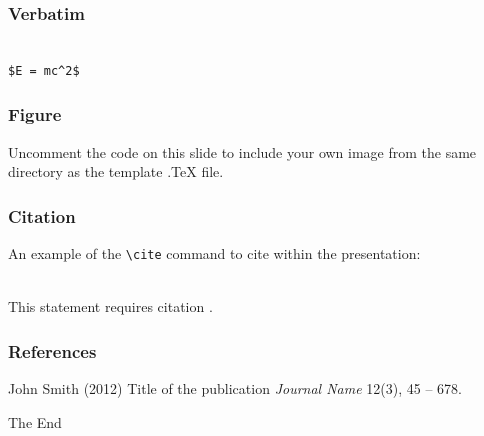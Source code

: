 \documentclass{beamer}
\begin{document}
\begin{frame}[fragile] %
\frametitle{Verbatim}
\begin{example}
\begin{verbatim}

$E = mc^2$

\end{verbatim}
\end{example}
\end{frame}


\begin{frame}
\frametitle{Figure}
Uncomment the code on this slide to include your own image from the same directory as the template .TeX file.
\end{frame}


\begin{frame}[fragile] %
\frametitle{Citation}
An example of the \verb|\cite| command to cite within the presentation:\\~

This statement requires citation \cite{p1}.
\end{frame}


\begin{frame}
\frametitle{References}
\footnotesize{
\begin{thebibliography}{99} %
 John Smith (2012)
\newblock Title of the publication
\newblock \emph{Journal Name} 12(3), 45 -- 678.
\end{thebibliography}
}
\end{frame}


\begin{frame}
\Huge{\centerline{The End}}
\end{frame}

\end{document}
